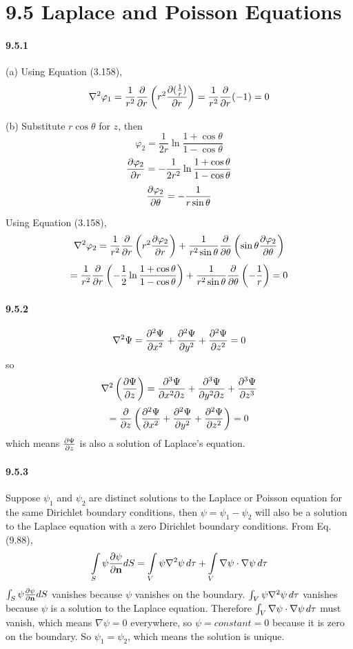 \documentclass[a4paper]{article}
\begin{document}
\section*{9.5 Laplace and Poisson Equations}

\paragraph{9.5.1}
(a) Using Equation (3.158),
\[
\nabla^2\varphi_1=\frac{1}{r^2}\frac{\partial}{\partial r}\left(r^2\frac{\partial(\frac{1}{r})}{\partial r} \right)=\frac{1}{r^2}\frac{\partial}{\partial r}(-1)=0
\]

(b)
Substitute $r\cos\theta$ for $z$, then
\[
\varphi_2=\frac{1}{2r}\ln\frac{1+\cos\theta}{1-\cos\theta}
\]
\[
\frac{\partial\varphi_2}{\partial r}=-\frac{1}{2r^2}\ln\frac{1+\cos\theta}{1-\cos\theta}
\]
\[
\frac{\partial\varphi_2}{\partial\theta}=-\frac{1}{r\sin\theta}
\]

Using Equation (3.158),
\[
\nabla^2\varphi_2=\frac{1}{r^2}\frac{\partial}{\partial r}\left(r^2\frac{\partial\varphi_2}{\partial r} \right)+\frac{1}{r^2\sin\theta}\frac{\partial}{\partial\theta}\left(\sin\theta\frac{\partial\varphi_2}{\partial\theta} \right)
\]
\[
=\frac{1}{r^2}\frac{\partial}{\partial r}\left(-\frac{1}{2}\ln\frac{1+\cos\theta}{1-\cos\theta} \right)+\frac{1}{r^2\sin\theta}\frac{\partial}{\partial\theta}\left(-\frac{1}{r} \right)=0
\]

\paragraph{9.5.2}
\[
\nabla^2\Psi=\frac{\partial^2\Psi}{\partial x^2}+\frac{\partial^2\Psi}{\partial y^2}+\frac{\partial^2\Psi}{\partial z^2}=0
\]
so
\[
\nabla^2\left(\frac{\partial\Psi}{\partial z}\right)=\frac{\partial^3\Psi}{\partial x^2\partial z}+\frac{\partial^3\Psi}{\partial y^2\partial z}+\frac{\partial^3\Psi}{\partial z^3}
\]
\[
=\frac{\partial}{\partial z}\left(\frac{\partial^2\Psi}{\partial x^2}+\frac{\partial^2\Psi}{\partial y^2}+\frac{\partial^2\Psi}{\partial z^2}\right)=0
\]
which means $\frac{\partial\Psi}{\partial z}$ is also a solution of Laplace's equation.

\paragraph{9.5.3}
Suppose $\psi_1$ and $\psi_2$ are distinct solutions to the Laplace or Poisson equation for the same Dirichlet boundary conditions, then $\psi=\psi_1-\psi_2$ will also be a solution to the Laplace equation with a zero Dirichlet boundary conditions. From Eq. (9.88),
\[
\int\displaylimits_S\psi\frac{\partial\psi}{\partial\mathbf{n}}dS=\int\displaylimits_V\psi\nabla^2\psi\,d\tau+\int\displaylimits_V   \nabla\psi\cdot\nabla\psi\,d\tau
\]
$\int\displaylimits_S\psi\frac{\partial\psi}{\partial\mathbf{n}}dS$ vanishes because $\psi$ vanishes on the boundary. $\int\displaylimits_V\psi\nabla^2\psi\,d\tau$ vanishes because $\psi$ is a solution to the Laplace equation. Therefore $\int\displaylimits_V   \nabla\psi\cdot\nabla\psi\,d\tau$ must vanish, which means $\nabla\psi=0$ everywhere, so $\psi=constant=0$ because it is zero on the boundary. So $\psi_1=\psi_2$, which means the solution is unique.
\end{document}
